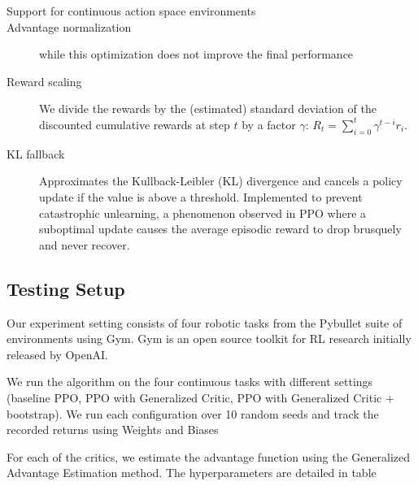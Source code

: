 \begin{description}
\item[Support for continuous action space environments] %
\item[Advantage normalization] while this optimization does not improve the final performance\cite{andrychowicz2020learning}
\item[Reward scaling] We divide the rewards by the (estimated) standard deviation of the discounted cumulative rewards at step $t$ by a factor $\gamma$: $R_t = \sum_{i=0}^t \gamma^{t-i} r_i$. %
\item[KL fallback] Approximates the Kullback-Leibler (KL) divergence and cancels a policy update if the value is above a threshold. Implemented to prevent catastrophic unlearning\cite{dossa2021empirical}, a phenomenon observed in PPO where a suboptimal update causes the average episodic reward to drop brusquely and never recover.
\end{description}

\subsection{Testing Setup}

Our experiment setting consists of four robotic tasks from the Pybullet suite of environments using Gym. Gym\cite{brockman2016openai} is an open source toolkit for RL research initially released by OpenAI. 

We run the algorithm on the four continuous tasks with different settings (baseline PPO, PPO with Generalized Critic, PPO with Generalized Critic + bootstrap). We run each configuration over 10 random seeds and track the recorded returns using Weights and Biases\cite{wandb}

For each of the critics, we estimate the advantage function using the Generalized Advantage Estimation method\cite{schulman2015highdimensional}.
The hyperparameters are detailed in table %

